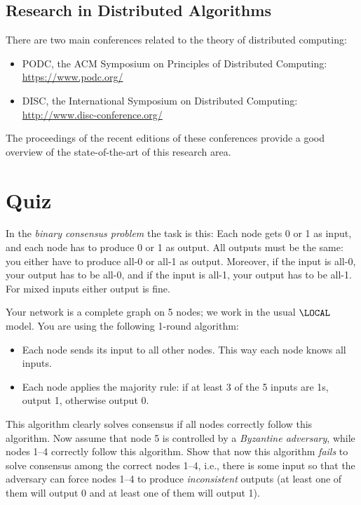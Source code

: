 \subsection{Research in Distributed Algorithms}

There are two main conferences related to the theory of distributed computing:
\begin{itemize}
    \item PODC, the ACM Symposium on Principles of Distributed Computing:
    \url{https://www.podc.org/}
    \item DISC, the International Symposium on Distributed Computing:
    \url{http://www.disc-conference.org/}
\end{itemize}
The proceedings of the recent editions of these conferences provide a good overview of the state-of-the-art of this research area.


\section{Quiz}\label{sec:quiz12}
  
In the \emph{binary consensus problem} the task is this: Each node gets 0 or 1 as input, and each node has to produce 0 or 1 as output. All outputs must be the same: you either have to produce all-0 or all-1 as output. Moreover, if the input is all-0, your output has to be all-0, and if the input is all-1, your output has to be all-1. For mixed inputs either output is fine.

Your network is a complete graph on 5 nodes; we work in the usual $\LOCAL$ model. You are using the following 1-round algorithm:
\begin{itemize}
  \item Each node sends its input to all other nodes. This way each node knows all inputs.
  \item Each node applies the majority rule: if at least 3 of the 5 inputs are 1s, output 1, otherwise output 0.
\end{itemize}

This algorithm clearly solves consensus if all nodes correctly follow this algorithm. Now assume that node 5 is controlled by a \emph{Byzantine adversary}, while nodes 1--4 correctly follow this algorithm. Show that now this algorithm \emph{fails} to solve consensus among the correct nodes 1--4, i.e., there is some input so that the adversary can force nodes 1--4 to produce \emph{inconsistent} outputs (at least one of them will output 0 and at least one of them will output 1).

